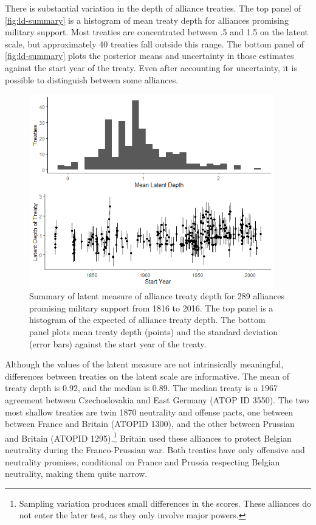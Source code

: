 \documentclass[12pt]{article}
\begin{document}
There is substantial variation in the depth of alliance treaties. 
The top panel of \autoref{fig:ld-summary} is a histogram of mean treaty depth for alliances promising military support.  
Most treaties are concentrated between .5 and 1.5 on the latent scale, but approximately 40 treaties fall outside this range. 
The bottom panel of \autoref{fig:ld-summary} plots the posterior means and uncertainty in those estimates against the start year of the treaty. 
Even after accounting for uncertainty, it is possible to distinguish between some alliances. 


\begin{figure}
	\centering
		\includegraphics[width=0.95\textwidth]{../figures/ld-summary.png}
	\caption{Summary of latent measure of alliance treaty depth for 289 alliances promising military support from 1816 to 2016. The top panel is a histogram of the expected of alliance treaty depth. The bottom panel plots mean treaty depth (points) and the standard deviation (error bars) against the start year of the treaty.}
	\label{fig:ld-summary}
\end{figure}


Although the values of the latent measure are not intrinsically meaningful, differences between treaties on the latent scale are informative. 
The mean of treaty depth is 0.92, and the median is 0.89. 
The median treaty is a 1967 agreement between Czechoslovakia and East Germany (ATOP ID 3550). 
The two most shallow treaties are twin 1870 neutrality and offense pacts, one between between France and Britain (ATOPID 1300), and the other between Prussian and Britain (ATOPID 1295).\footnote{
Sampling variation produces small differences in the scores. These alliances do not enter the later test, as they only involve major powers.} 
Britain used these alliances to protect Belgian neutrality during the Franco-Prussian war.  
Both treaties have only offensive and neutrality promises, conditional on France and Prussia respecting Belgian neutrality, making them quite narrow. 
\end{document}
